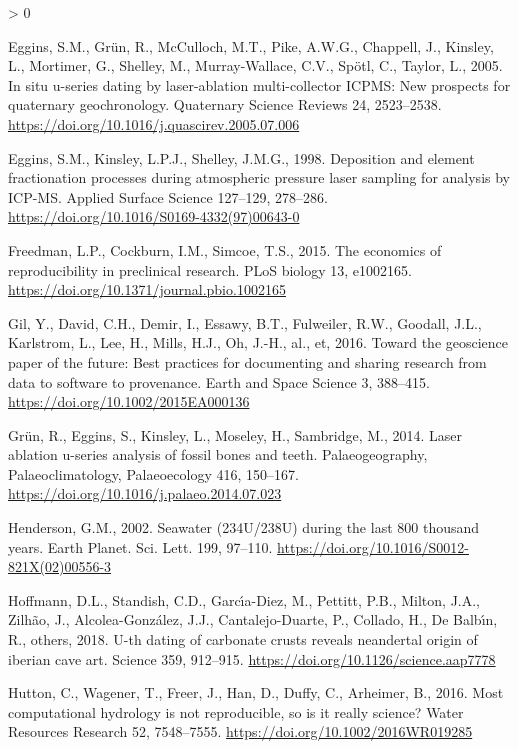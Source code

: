 \documentclass[]{elsarticle} %
\newlength{\cslhangindent}
\newenvironment{CSLReferences}[2] %
 {%
  \setlength{\parindent}{0pt}
  \ifodd #1 \everypar{\setlength{\hangindent}{\cslhangindent}}\ignorespaces\fi
  \ifnum #2 > 0
  \setlength{\parskip}{#2\baselineskip}
  \fi
 }%
 {}
\begin{document}
\begin{CSLReferences}{1}{0}
\leavevmode\hypertarget{ref-Eggins2005}{}%
Eggins, S.M., Grün, R., McCulloch, M.T., Pike, A.W.G., Chappell, J., Kinsley, L., Mortimer, G., Shelley, M., Murray-Wallace, C.V., Spötl, C., Taylor, L., 2005. In situ u-series dating by laser-ablation multi-collector ICPMS: New prospects for quaternary geochronology. Quaternary Science Reviews 24, 2523--2538. \url{https://doi.org/10.1016/j.quascirev.2005.07.006}

\leavevmode\hypertarget{ref-RN2257}{}%
Eggins, S.M., Kinsley, L.P.J., Shelley, J.M.G., 1998. Deposition and element fractionation processes during atmospheric pressure laser sampling for analysis by ICP-MS. Applied Surface Science 127--129, 278--286. \url{https://doi.org/10.1016/S0169-4332(97)00643-0}

\leavevmode\hypertarget{ref-freedman2015economics}{}%
Freedman, L.P., Cockburn, I.M., Simcoe, T.S., 2015. The economics of reproducibility in preclinical research. PLoS biology 13, e1002165. \url{https://doi.org/10.1371/journal.pbio.1002165}

\leavevmode\hypertarget{ref-Gil_et_al_2016}{}%
Gil, Y., David, C.H., Demir, I., Essawy, B.T., Fulweiler, R.W., Goodall, J.L., Karlstrom, L., Lee, H., Mills, H.J., Oh, J.-H., al., et, 2016. Toward the geoscience paper of the future: Best practices for documenting and sharing research from data to software to provenance. Earth and Space Science 3, 388--415. \url{https://doi.org/10.1002/2015EA000136}

\leavevmode\hypertarget{ref-Gruen2014}{}%
Grün, R., Eggins, S., Kinsley, L., Moseley, H., Sambridge, M., 2014. Laser ablation u-series analysis of fossil bones and teeth. Palaeogeography, Palaeoclimatology, Palaeoecology 416, 150--167. \url{https://doi.org/10.1016/j.palaeo.2014.07.023}

\leavevmode\hypertarget{ref-RN35}{}%
Henderson, G.M., 2002. Seawater (234U/238U) during the last 800 thousand years. Earth Planet. Sci. Lett. 199, 97--110. \url{https://doi.org/10.1016/S0012-821X(02)00556-3}

\leavevmode\hypertarget{ref-hoffmann2018u}{}%
Hoffmann, D.L., Standish, C.D., Garcı́a-Diez, M., Pettitt, P.B., Milton, J.A., Zilhão, J., Alcolea-González, J.J., Cantalejo-Duarte, P., Collado, H., De Balbı́n, R., others, 2018. U-th dating of carbonate crusts reveals neandertal origin of iberian cave art. Science 359, 912--915. \url{https://doi.org/10.1126/science.aap7778}

\leavevmode\hypertarget{ref-Hutton_et_al_2016}{}%
Hutton, C., Wagener, T., Freer, J., Han, D., Duffy, C., Arheimer, B., 2016. Most computational hydrology is not reproducible, so is it really science? Water Resources Research 52, 7548--7555. \url{https://doi.org/10.1002/2016WR019285}


\end{CSLReferences}
\end{document}

